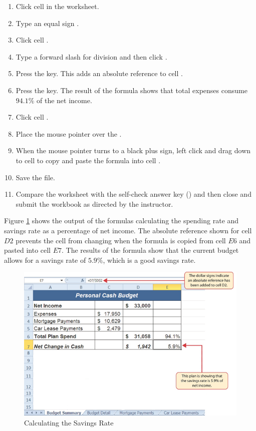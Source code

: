 \begin{enumbox}
	\begin{enumerate}
		\item Click cell  in the  worksheet.
		\item Type an equal sign \fmtTyping{=}.
		\item Click cell .
		\item Type a forward slash \fmtTyping{/} for division and then click .
		\item Press the  key. This adds an absolute reference to cell .
		\item Press the  key. The result of the formula shows that total expenses consume $ 94.1\% $ of the net income.
		\item Click cell .
		\item Place the mouse pointer over the .
		\item When the mouse pointer turns to a black plus sign, left click and drag down to cell  to copy and paste the formula into cell .
		\item Save the  file.
		\item Compare the worksheet with the self-check answer key () and then close and submit the  workbook as directed by the instructor.
	\end{enumerate}
\end{enumbox}

Figure \ref{02:fig39} shows the output of the formulas calculating the spending rate and savings rate as a percentage of net income. The absolute reference shown for cell $ D2 $ prevents the cell from changing when the formula is copied from cell $ E6 $ and pasted into cell $ E7 $. The results of the formula show that the current budget allows for a savings rate of $ 5.9\% $, which is a good savings rate.

\begin{figure}[H]
	\centering
	\includegraphics[width=\maxwidth{.95\linewidth}]{gfx/ch02_fig39}
	\caption{Calculating the Savings Rate}
	\label{02:fig39}
\end{figure}


